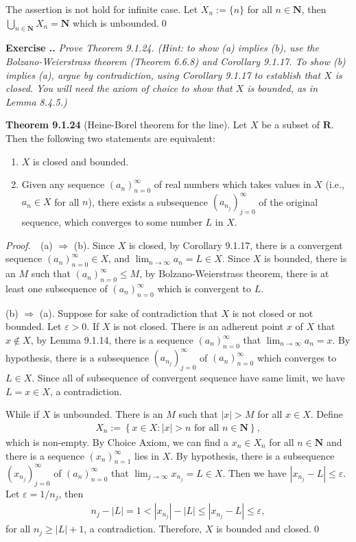 \documentclass{book}
\newcommand{\pff}{\vspace{.25em}\noindent\emph{Proof.}~~}
\newcommand{\titl}[1]{\noindent\textbf{#1}}
\newcounter{Exercise}[section]
\renewcommand{\theExercise}{\thesection.\arabic{Exercise}.}
\newcommand{\new}{\vspace{1.5em}\noindent\textbf{{Exercise \stepcounter{Exercise}\textbf{\theExercise}}} }
\begin{document}
The assertion is not hold for infinite case. Let $X_n:=\{n\}$ for all $n\in\mathbf{N}$, then $\bigcup_{n\in\mathbf{N}}X_n=\mathbf{N}$ which is unbounded.\qed

\new\emph{Prove Theorem 9.1.24. (Hint: to show (a) implies (b), use the Bolzano-Weierstrass theorem (Theorem 6.6.8) and Corollary 9.1.17. To show (b) implies (a), argue by contradiction, using Corollary 9.1.17 to establish that $X$ is closed. You will need the axiom of choice to show that $X$ is bounded, as in Lemma 8.4.5.)}

\begin{framed}
\titl{Theorem 9.1.24} (Heine-Borel theorem for the line). Let $X$ be a subset of $\mathbf{R}$. Then the following two statements are equivalent:
\begin{enumerate}
    \item $X$ is closed and bounded.
    \item Given any sequence $(a_n)_{n=0}^{\infty}$ of real numbers which takes values in $X$ (i.e., $a_n\in X$ for all $n$), there exists a subsequence $(a_{n_j})_{j=0}^{\infty}$ of the original sequence, which converges to some number $L$ in $X$.
\end{enumerate}
\end{framed}

\pff (a) $\Rightarrow$ (b). Since $X$ is closed, by Corollary 9.1.17, there is a convergent sequence $(a_n)_{n=0}^{\infty}\in X$, and $\lim_{n\to\infty}a_n=L\in X$. Since $X$ is bounded, there is an $M$ such that $(a_n)_{n=0}^{\infty}\leq M$, by Bolzano-Weierstrass theorem, there is at least one subsequence of $(a_n)_{n=0}^\infty$ which is convergent to $L$.

(b) $\Rightarrow$ (a). Suppose for sake of contradiction that $X$ is not closed or not bounded. Let $\varepsilon>0$. If $X$ is not closed. There is an adherent point $x$ of $X$ that $x\notin X$, by Lemma 9.1.14, there is a sequence $(a_{n})_{n=0}^{\infty}$ that $\lim_{n\to\infty}a_n=x$. By hypothesis, there is a subsequence $(a_{n_j})_{j=0}^{\infty}$ of $(a_{n})_{n=0}^{\infty}$ which converges to $L\in X$. Since all of subsequence of convergent sequence have same limit, we have $L=x\in X$, a contradiction.

While if $X$ is unbounded. There is an $M$ such that $|x|>M$ for all $x\in X$. Define
    \begin{align*}
        X_n:=\left\{x\in X:|x|>n\textrm{ for all }n\in\mathbf{N}\right\},
    \end{align*}
which is non-empty. By Choice Axiom, we can find a $x_n\in X_n$ for all $n\in\mathbf{N}$ and there is a sequence $(x_n)_{n=1}^{\infty}$ lies in $X$. By hypothesis, there is a subsequence $(x_{n_j})_{j=0}^{\infty}$ of $(a_{n})_{n=0}^{\infty}$ that $\lim_{j\to\infty}x_{n_j}=L\in X$. Then we have $|x_{n_j}-L|\leq\varepsilon$. Let $\varepsilon=1/n_j$, then
    \begin{align*}
        n_j-|L|=1<|x_{n_j}|-|L|\leq|x_{n_j}-L|\leq\varepsilon,
    \end{align*}
for all $n_j\geq |L|+1$, a contradiction. Therefore, $X$ is bounded and closed.\qed
\end{document}
